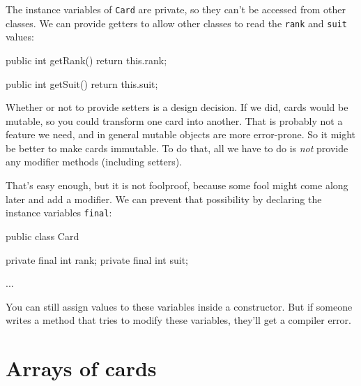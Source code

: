 \documentclass[12pt]{book}
\theoremstyle{exercise}
\newcommand{\java}[1]{\verb"#1"}
\begin{document}
The instance variables of \java{Card} are private, so they can't be accessed from other classes.
We can provide getters to allow other classes to read the \java{rank} and \java{suit} values:

\begin{code}
    public int getRank() {
        return this.rank;
    }

    public int getSuit() {
        return this.suit;
    }
\end{code}

Whether or not to provide setters is a design decision.
If we did, cards would be mutable, so you could transform one card into another.
That is probably not a feature we need, and in general mutable objects are more error-prone.
So it might be better to make cards immutable.
To do that, all we have to do is {\em not} provide any modifier methods (including setters).

That's easy enough, but it is not foolproof, because some fool might come along later and add a modifier.
We can prevent that possibility by declaring the instance variables \java{final}:

\begin{code}
public class Card {
    private final int rank;
    private final int suit;

    ...
}
\end{code}

You can still assign values to these variables inside a constructor.
But if someone writes a method that tries to modify these variables, they'll get a compiler error.


\section{Arrays of cards}
\label{cardarray}




\end{document}

